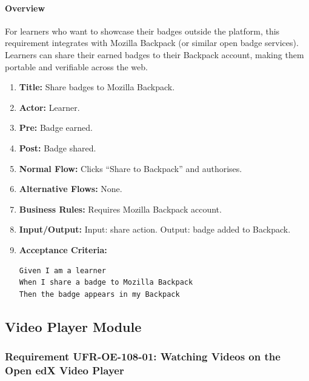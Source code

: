 \paragraph{Overview}
For learners who want to showcase their badges outside the platform, this requirement integrates with Mozilla Backpack (or similar open badge services). Learners can share their earned badges to their Backpack account, making them portable and verifiable across the web.
\begin{enumerate}[label=\textbf{\arabic*.}]
\item \textbf{Title:} Share badges to Mozilla Backpack.
\item \textbf{Actor:} Learner.
\item \textbf{Pre:} Badge earned.
\item \textbf{Post:} Badge shared.
\item \textbf{Normal Flow:} Clicks “Share to Backpack” and authorises.
\item \textbf{Alternative Flows:} None.
\item \textbf{Business Rules:} Requires Mozilla Backpack account.
\item \textbf{Input/Output:} Input: share action. Output: badge added to Backpack.
\item \textbf{Acceptance Criteria:}
    \begin{verbatim}
Given I am a learner
When I share a badge to Mozilla Backpack
Then the badge appears in my Backpack
    \end{verbatim}
\end{enumerate}

\subsection{Video Player Module}
\subsubsection{Requirement UFR-OE-108-01: Watching Videos on the Open edX Video Player}
